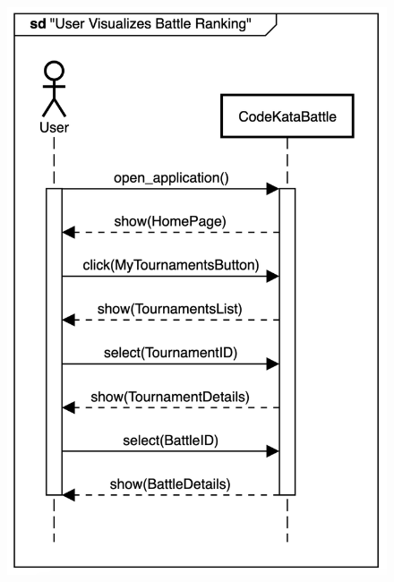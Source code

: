 \documentclass{Configuration_Files/Template}
\begin{document}
\begin{figure}[H]
\includegraphics[scale = 0.45]{Images/SequenceDiagrams/UserVisualizesBattleRankingSeqDiagram.png}\\
\centering
\end{figure}
\end{document}

